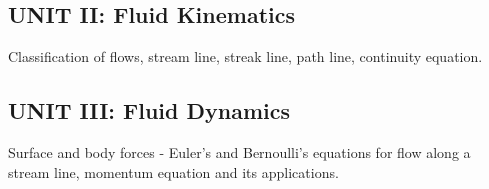\documentclass[12pt, a4paper]{article}
\begin{document}
                                                                                                                                                                                                                                                                                                                                                                                                            \subsection*{UNIT II: Fluid Kinematics}
                                                                                                                                                                                                                                                                                                                                                                                                            \noindent Classification of flows, stream line, streak line, path line, continuity equation.

                                                                                                                                                                                                                                                                                                                                                                                                            \subsection*{UNIT III: Fluid Dynamics}
                                                                                                                                                                                                                                                                                                                                                                                                            \noindent Surface and body forces - Euler’s and Bernoulli’s equations for flow along a stream line, momentum equation and its applications.
\end{document}
